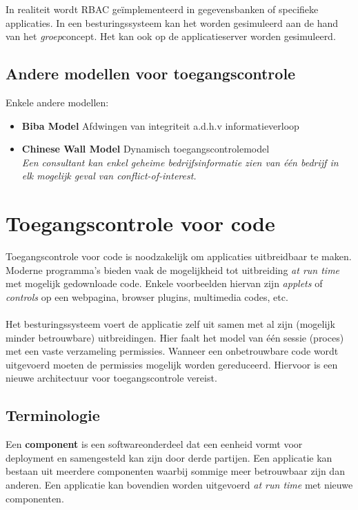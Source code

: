 \documentclass[../main.tex]{subfiles}
\begin{document}
In realiteit wordt RBAC ge\"implementeerd in gegevensbanken of specifieke applicaties. In een besturingssysteem kan het worden gesimuleerd aan de hand van het \textit{groep}concept. Het kan ook op de applicatieserver worden gesimuleerd.


\subsection{Andere modellen voor toegangscontrole}
Enkele andere modellen:
\begin{itemize}
	\item \textbf{Biba Model} Afdwingen van integriteit a.d.h.v informatieverloop
	\item \textbf{Chinese Wall Model} Dynamisch toegangscontrolemodel \\ 
	\textit{Een consultant kan enkel geheime bedrijfsinformatie zien van \'e\'en bedrijf in elk mogelijk geval van conflict-of-interest. }
\end{itemize}

\section{Toegangscontrole voor code}
Toegangscontrole voor code is noodzakelijk om applicaties uitbreidbaar te maken. Moderne programma's bieden vaak de mogelijkheid tot uitbreiding \textit{at run time} met mogelijk gedownloade code.  Enkele voorbeelden hiervan zijn \textit{applets} of \textit{controls} op een webpagina, browser plugins, multimedia codes, etc. 
\\\\
Het besturingssysteem voert de applicatie zelf uit samen met al zijn (mogelijk minder betrouwbare) uitbreidingen. Hier faalt het model van \'e\'en sessie (proces) met een vaste verzameling permissies. Wanneer een onbetrouwbare code wordt uitgevoerd moeten de permissies mogelijk worden gereduceerd. Hiervoor is een nieuwe architectuur voor toegangscontrole vereist.

\subsection{Terminologie}


Een \textbf{component} is een softwareonderdeel dat een eenheid vormt voor deployment en samengesteld kan zijn door derde partijen. Een applicatie kan bestaan uit meerdere componenten waarbij sommige meer betrouwbaar zijn dan anderen. Een applicatie kan bovendien worden uitgevoerd \textit{at run time} met nieuwe componenten. 
\end{document}

